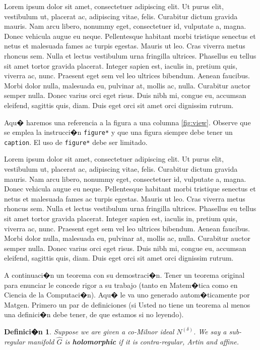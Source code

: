 \documentclass[10pt,twoside]{rcmart} %
\newtheorem{definition}[theorem]{Definici�n}
\begin{document}
Lorem ipsum dolor sit amet, consectetuer adipiscing elit. Ut purus elit, vestibulum ut, placerat ac, adipiscing vitae, felis. Curabitur dictum gravida mauris. Nam arcu libero, nonummy eget, consectetuer id, vulputate a, magna. Donec vehicula augue eu neque. Pellentesque habitant morbi tristique senectus et netus et malesuada fames ac turpis egestas. Mauris ut leo. Cras viverra metus rhoncus sem. Nulla et lectus vestibulum urna fringilla ultrices. Phasellus eu tellus sit amet tortor gravida placerat. Integer sapien est, iaculis in, pretium quis, viverra ac, nunc. Praesent eget sem vel leo ultrices bibendum. Aenean faucibus. Morbi dolor nulla, malesuada eu, pulvinar at, mollis ac, nulla. Curabitur auctor semper nulla. Donec varius orci eget risus. Duis nibh mi, congue eu, accumsan eleifend, sagittis quis, diam. Duis eget orci sit amet orci dignissim rutrum.

Aqu� haremos una referencia a la figura a una columna \ref{fig:view}. Observe que se emplea la instrucci�n \texttt{figure*} y que una figura siempre debe tener un \texttt{caption}. El uso de \texttt{figure*} debe ser limitado.

Lorem ipsum dolor sit amet, consectetuer adipiscing elit. Ut purus elit, vestibulum ut, placerat ac, adipiscing vitae, felis. Curabitur dictum gravida mauris. Nam arcu libero, nonummy eget, consectetuer id, vulputate a, magna. Donec vehicula augue eu neque. Pellentesque habitant morbi tristique senectus et netus et malesuada fames ac turpis egestas. Mauris ut leo. Cras viverra metus rhoncus sem. Nulla et lectus vestibulum urna fringilla ultrices. Phasellus eu tellus sit amet tortor gravida placerat. Integer sapien est, iaculis in, pretium quis, viverra ac, nunc. Praesent eget sem vel leo ultrices bibendum. Aenean faucibus. Morbi dolor nulla, malesuada eu, pulvinar at, mollis ac, nulla. Curabitur auctor semper nulla. Donec varius orci eget risus. Duis nibh mi, congue eu, accumsan eleifend, sagittis quis, diam. Duis eget orci sit amet orci dignissim rutrum.

A continuaci�n un teorema con su demostraci�n. Tener un teorema original para enunciar le concede rigor a su trabajo (tanto en Matem�tica como en Ciencia de la Computaci�n). Aqu� le va uno generado autom�ticamente por Matgen. Primero un par de definiciones (si Usted no tiene un teorema al menos una definici�n debe tener, de que estamos si no leyendo).

\begin{definition}
	Suppose we are given a co-Milnor ideal ${N^{(\delta)}}$.  We say a sub-regular manifold $\hat{G}$ is \textbf{holomorphic} if it is contra-regular, Artin and affine.
\end{definition}
\end{document}
